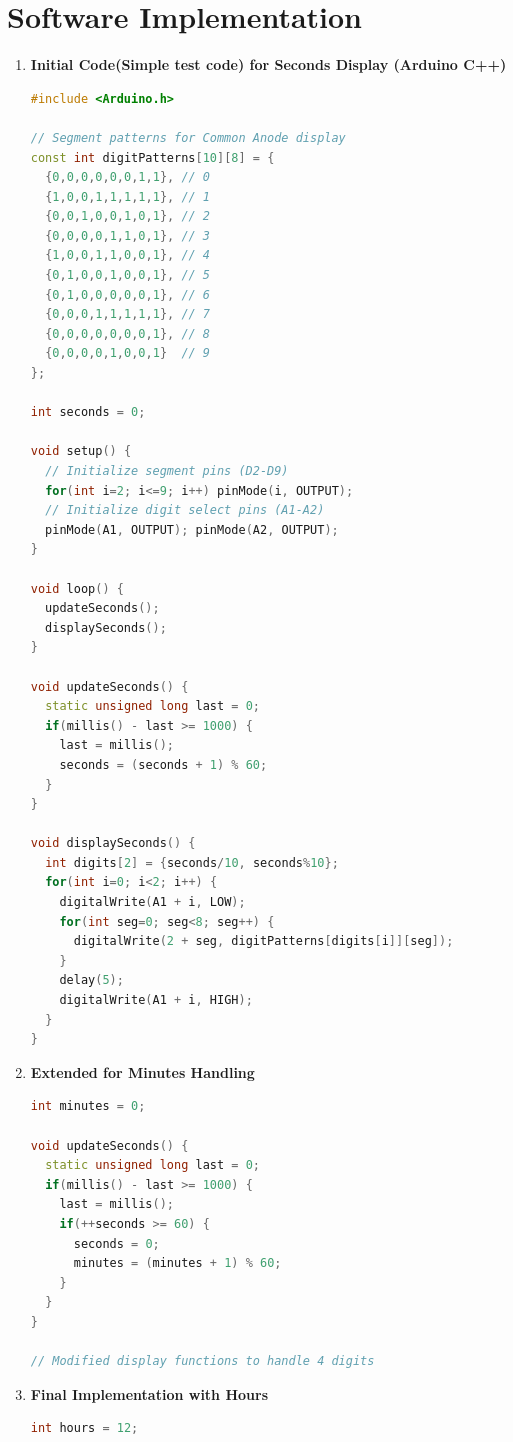 \documentclass[journal]{IEEEtran}
\begin{document}
\section{Software Implementation}
\begin{enumerate}
    \item \textbf{Initial Code(Simple test code) for Seconds Display (Arduino C++)}
    \begin{lstlisting}[language=C++]
#include <Arduino.h>

// Segment patterns for Common Anode display
const int digitPatterns[10][8] = {
  {0,0,0,0,0,0,1,1}, // 0
  {1,0,0,1,1,1,1,1}, // 1
  {0,0,1,0,0,1,0,1}, // 2
  {0,0,0,0,1,1,0,1}, // 3
  {1,0,0,1,1,0,0,1}, // 4
  {0,1,0,0,1,0,0,1}, // 5
  {0,1,0,0,0,0,0,1}, // 6
  {0,0,0,1,1,1,1,1}, // 7
  {0,0,0,0,0,0,0,1}, // 8
  {0,0,0,0,1,0,0,1}  // 9
};

int seconds = 0;

void setup() {
  // Initialize segment pins (D2-D9)
  for(int i=2; i<=9; i++) pinMode(i, OUTPUT);
  // Initialize digit select pins (A1-A2)
  pinMode(A1, OUTPUT); pinMode(A2, OUTPUT);
}

void loop() {
  updateSeconds();
  displaySeconds();
}

void updateSeconds() {
  static unsigned long last = 0;
  if(millis() - last >= 1000) {
    last = millis();
    seconds = (seconds + 1) % 60;
  }
}

void displaySeconds() {
  int digits[2] = {seconds/10, seconds%10};
  for(int i=0; i<2; i++) {
    digitalWrite(A1 + i, LOW);
    for(int seg=0; seg<8; seg++) {
      digitalWrite(2 + seg, digitPatterns[digits[i]][seg]);
    }
    delay(5);
    digitalWrite(A1 + i, HIGH);
  }
}
    \end{lstlisting}

    \item \textbf{Extended for Minutes Handling}
    \begin{lstlisting}[language=C++]
int minutes = 0;

void updateSeconds() {
  static unsigned long last = 0;
  if(millis() - last >= 1000) {
    last = millis();
    if(++seconds >= 60) {
      seconds = 0;
      minutes = (minutes + 1) % 60;
    }
  }
}

// Modified display functions to handle 4 digits
    \end{lstlisting}

    \item \textbf{Final Implementation with Hours}
    \begin{lstlisting}[language=C++]
int hours = 12;


\end{lstlisting}
\end{enumerate}
\end{document}
